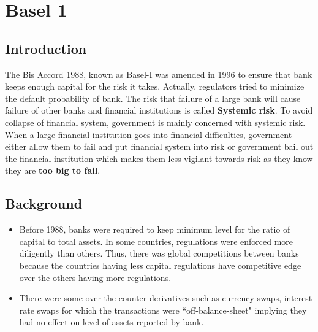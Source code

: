 \documentclass[11pt]{article}
\numberwithin{equation}{section}
\begin{document}


\pagebreak

\renewcommand\contentsname{{\Huge Contents}\vspace{0.5cm}}
\cleardoublepage
{}
{}
\setcounter{tocdepth}{8}

\tableofcontents

\cleardoublepage
{}
\renewcommand\listfigurename{{\Huge List of Figures}\vspace{0.5cm}}

\pagebreak

\section{Basel 1}
\medskip

\subsection{Introduction}
\medskip

The Bis Accord 1988, known as Basel-I was amended in 1996 to ensure that bank keeps enough capital for the risk it takes.
Actually, regulators tried to minimize the default probability of bank. The risk that failure of a large bank will cause failure of other banks and financial institutions is called \textbf{Systemic risk}. To avoid collapse of financial system, government is mainly concerned with systemic risk. When a large financial institution goes into financial difficulties,  government either allow them to fail and put financial system into risk or government bail out the financial institution which makes them less vigilant towards risk as they know they are \textbf{too big to fail}.

\subsection{Background}
\medskip

\begin{itemize}
\item Before 1988, banks were required to keep minimum level for the ratio of capital to total assets. In some countries, regulations were enforced more diligently than others. Thus, there was global competitions between banks because the countries having less capital regulations have competitive edge over the others having more regulations.
\item There were some over the counter derivatives such as currency swaps, interest rate swaps for which the transactions were ``off-balance-sheet" implying they had no effect on level of assets reported by bank. 

\end{itemize}
\end{document}
